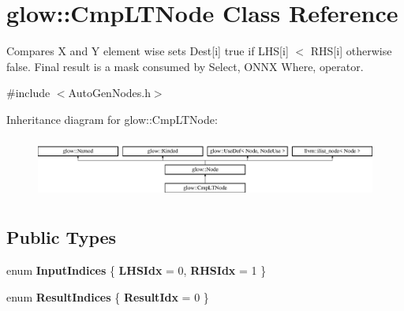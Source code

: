 \hypertarget{classglow_1_1_cmp_l_t_node}{}\section{glow\+:\+:Cmp\+L\+T\+Node Class Reference}
\label{classglow_1_1_cmp_l_t_node}


Compares X and Y element wise sets Dest\mbox{[}i\mbox{]} true if L\+HS\mbox{[}i\mbox{]} $<$ R\+HS\mbox{[}i\mbox{]} otherwise false. Final result is a mask consumed by Select, O\+N\+NX Where, operator.  




{\ttfamily \#include $<$Auto\+Gen\+Nodes.\+h$>$}

Inheritance diagram for glow\+:\+:Cmp\+L\+T\+Node\+:\begin{figure}[H]
\begin{center}
\leavevmode
\includegraphics[height=2.028986cm]{classglow_1_1_cmp_l_t_node}
\end{center}
\end{figure}
\subsection*{Public Types}
\begin{DoxyCompactItemize}
\item 
\mbox{\label{classglow_1_1_cmp_l_t_node_a9ae474b10a45732791bc9549f10be944}} 
enum {\bfseries Input\+Indices} \{ {\bfseries L\+H\+S\+Idx} = 0, 
{\bfseries R\+H\+S\+Idx} = 1
 \}
\item 
\mbox{\label{classglow_1_1_cmp_l_t_node_ac4408928e30e6bac13e8d01f11050e8b}} 
enum {\bfseries Result\+Indices} \{ {\bfseries Result\+Idx} = 0
 \}
\end{DoxyCompactItemize}
